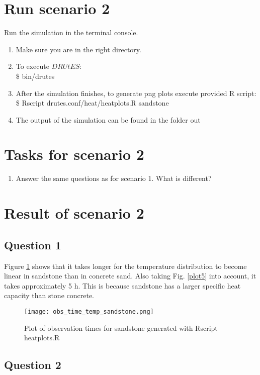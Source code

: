 \documentclass[
10pt, %
a4paper, %
oneside, %
headinclude,footinclude, %
BCOR5mm, %
]{scrartcl}
\begin{document}
\section*{Run scenario 2}
Run the simulation in the terminal console.
\begin{enumerate}
\item Make sure you are in the right directory. 
\item To execute $DRUtES$: \\
\$ bin/drutes
\item After the simulation finishes, to generate png plots execute provided R script: \\
\$ Rscript drutes.conf/heat/heatplots.R sandstone
\item The output of the simulation can be found in the folder out
\end{enumerate}

\section*{Tasks for scenario 2}

\begin{enumerate}
\item Answer the same questions as for scenario 1. What is different?
\end{enumerate}

\section*{Result of scenario 2}
\subsection*{Question 1}
Figure \ref{plot4} shows that it takes longer for the temperature distribution to become linear in sandstone than in concrete sand. Also taking Fig. \ref{plot5} into account, it takes approximately 5 h. This is because sandstone has a larger specific heat capacity than stone concrete.

\begin{figure}[!h]
\centering
\texttt{[image: obs\_time\_temp\_sandstone.png]}
\caption{\label{plot4}Plot of observation times for sandstone generated with Rscript heatplots.R}
\end{figure}

\subsection*{Question 2}
\end{document}

